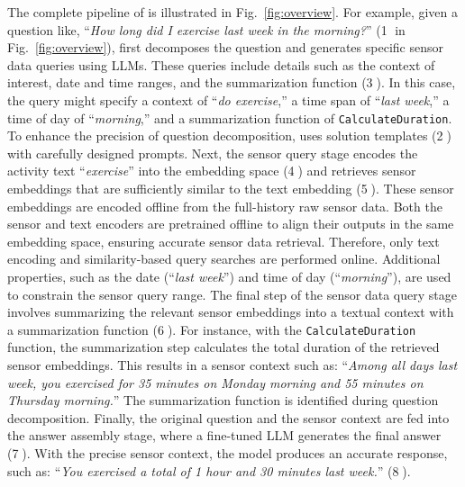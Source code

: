

The complete pipeline of \Method is illustrated in Fig.~\ref{fig:overview}. For example, given a question like, “\textit{How long did I exercise last week in the morning?}” (\textcircled{1} in Fig.~\ref{fig:overview}), \Method first decomposes the question and generates specific sensor data queries using LLMs. These queries include details such as the context of interest, date and time ranges, and the summarization function (\textcircled{3}). In this case, the query might specify a context of “\textit{do exercise},” a time span of “\textit{last week},” a time of day of “\textit{morning},” and a summarization function of \texttt{CalculateDuration}. To enhance the precision of question decomposition, \Method uses solution templates (\textcircled{2}) with carefully designed prompts. Next, the sensor query stage encodes the activity text “\textit{exercise}” into the embedding space (\textcircled{4}) and retrieves sensor embeddings that are sufficiently similar to the text embedding (\textcircled{5}). These sensor embeddings are encoded offline from the full-history raw sensor data. Both the sensor and text encoders are pretrained offline to align their outputs in the same embedding space, ensuring accurate sensor data retrieval.
Therefore, only text encoding and similarity-based query searches are performed online.
Additional properties, such as the date (“\textit{last week}”) and time of day (“\textit{morning}”), are used to constrain the sensor query range. The final step of the sensor data query stage involves summarizing the relevant sensor embeddings into a textual context with a summarization function (\textcircled{6}). For instance, with the \texttt{CalculateDuration} function, the summarization step calculates the total duration of the retrieved sensor embeddings. This results in a sensor context such as: “\textit{Among all days last week, you exercised for 35 minutes on Monday morning and 55 minutes on Thursday morning.}” The summarization function is identified during question decomposition. Finally, the original question and the sensor context are fed into the answer assembly stage, where a fine-tuned LLM generates the final answer (\textcircled{7}). With the precise sensor context, the model produces an accurate response, such as: “\textit{You exercised a total of 1 hour and 30 minutes last week.}” (\textcircled{8}).

